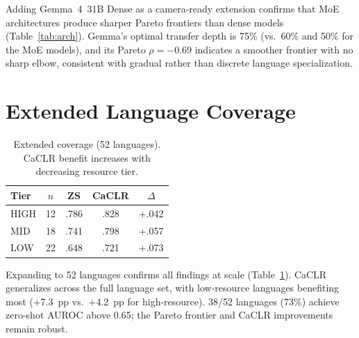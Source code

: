\documentclass[11pt,a4paper]{article}
\begin{document}
Adding Gemma~4~31B Dense as a camera-ready extension confirms that MoE architectures produce sharper Pareto frontiers than dense models (Table~\ref{tab:arch}).
Gemma's optimal transfer depth is 75\% (vs.\ 60\% and 50\% for the MoE models), and its Pareto $\rho = -0.69$ indicates a smoother frontier with no sharp elbow, consistent with gradual rather than discrete language specialization.

\section{Extended Language Coverage}
\label{app:extended}

\begin{table}[h]
\centering
\small
\begin{tabular}{@{}lcccc@{}}
\toprule
\textbf{Tier} & $n$ & \textbf{ZS} & \textbf{CaCLR} & $\Delta$ \\
\midrule
HIGH & 12 & .786 & .828 & +.042 \\
MID & 18 & .741 & .798 & +.057 \\
LOW & 22 & .648 & .721 & +.073 \\
\bottomrule
\end{tabular}
\caption{Extended coverage (52 languages). CaCLR benefit increases with decreasing resource tier.}
\label{tab:extended}
\end{table}

Expanding to 52 languages confirms all findings at scale (Table~\ref{tab:extended}).
CaCLR generalizes across the full language set, with low-resource languages benefiting most (+7.3~pp vs.\ +4.2~pp for high-resource).
38/52 languages (73\%) achieve zero-shot AUROC above 0.65; the Pareto frontier and CaCLR improvements remain robust.



\end{document}
